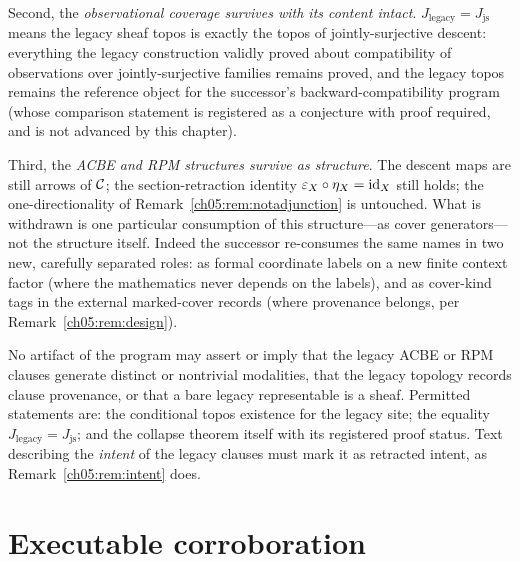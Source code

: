 Second, the \emph{observational coverage survives with its content intact}.
$J_{\mathrm{legacy}}=J_{\mathrm{js}}$ means the legacy sheaf topos is
exactly the topos of jointly-surjective descent: everything the legacy
construction validly proved about compatibility of observations over
jointly-surjective families remains proved, and the legacy topos remains the
reference object for the successor's backward-compatibility program (whose
comparison statement is registered as a conjecture with proof required, and
is not advanced by this chapter).

Third, the \emph{ACBE and RPM structures survive as structure}. The descent
maps are still arrows of $\mathcal{C}$; the section-retraction identity
$\varepsilon_X\circ\eta_X=\mathrm{id}_X$ still holds; the one-directionality of
Remark~\ref{ch05:rem:notadjunction} is untouched. What is withdrawn is one
particular consumption of this structure---as cover generators---not the
structure itself. Indeed the successor re-consumes the same names in two
new, carefully separated roles: as formal coordinate labels on a new finite
context factor (where the mathematics never depends on the labels), and as
cover-kind tags in the external marked-cover records (where provenance
belongs, per Remark~\ref{ch05:rem:design}).

\begin{ruleenv}
\label{ch05:rule:editorial}
No artifact of the program may assert or imply that the legacy ACBE or RPM
clauses generate distinct or nontrivial modalities, that the legacy topology
records clause provenance, or that a bare legacy representable is a sheaf.
Permitted statements are: the conditional topos existence for the legacy
site; the equality $J_{\mathrm{legacy}}=J_{\mathrm{js}}$; and the collapse
theorem itself with its registered proof status. Text describing the
\emph{intent} of the legacy clauses must mark it as retracted intent, as
Remark~\ref{ch05:rem:intent} does.
\end{ruleenv}

\section{Executable corroboration}\label{ch05:sec:certificate}

